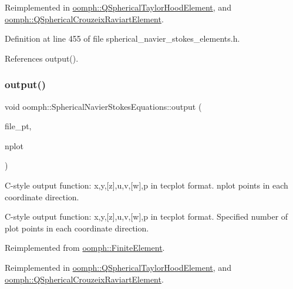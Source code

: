 Reimplemented in \hyperlink{classoomph_1_1QSphericalTaylorHoodElement_aa45522c214c7cb5ff01724ebafe988c6}{oomph\+::\+Q\+Spherical\+Taylor\+Hood\+Element}, and \hyperlink{classoomph_1_1QSphericalCrouzeixRaviartElement_a885098531e6431711647b581817af3c5}{oomph\+::\+Q\+Spherical\+Crouzeix\+Raviart\+Element}.



Definition at line 455 of file spherical\+\_\+navier\+\_\+stokes\+\_\+elements.\+h.



References output().

\mbox{\label{classoomph_1_1SphericalNavierStokesEquations_afd0fd2912515b6c23142046c5c200640}} 
\subsubsection{\texorpdfstring{output()}{output()}\hspace{0.1cm}{\footnotesize\ttfamily [4/4]}}
{\footnotesize\ttfamily void oomph\+::\+Spherical\+Navier\+Stokes\+Equations\+::output (\begin{DoxyParamCaption}\item[{F\+I\+LE $\ast$}]{file\+\_\+pt,  }\item[{const unsigned \&}]{nplot }\end{DoxyParamCaption})\hspace{0.3cm}{\ttfamily [virtual]}}



C-\/style output function\+: x,y,\mbox{[}z\mbox{]},u,v,\mbox{[}w\mbox{]},p in tecplot format. nplot points in each coordinate direction. 

C-\/style output function\+: x,y,\mbox{[}z\mbox{]},u,v,\mbox{[}w\mbox{]},p in tecplot format. Specified number of plot points in each coordinate direction. 

Reimplemented from \hyperlink{classoomph_1_1FiniteElement_adfaee690bb0608f03320eeb9d110d48c}{oomph\+::\+Finite\+Element}.



Reimplemented in \hyperlink{classoomph_1_1QSphericalTaylorHoodElement_ad8e462b97fd0aa1d0000e3440259ef61}{oomph\+::\+Q\+Spherical\+Taylor\+Hood\+Element}, and \hyperlink{classoomph_1_1QSphericalCrouzeixRaviartElement_a46b94f33217c9d82921055347255b4b5}{oomph\+::\+Q\+Spherical\+Crouzeix\+Raviart\+Element}.



